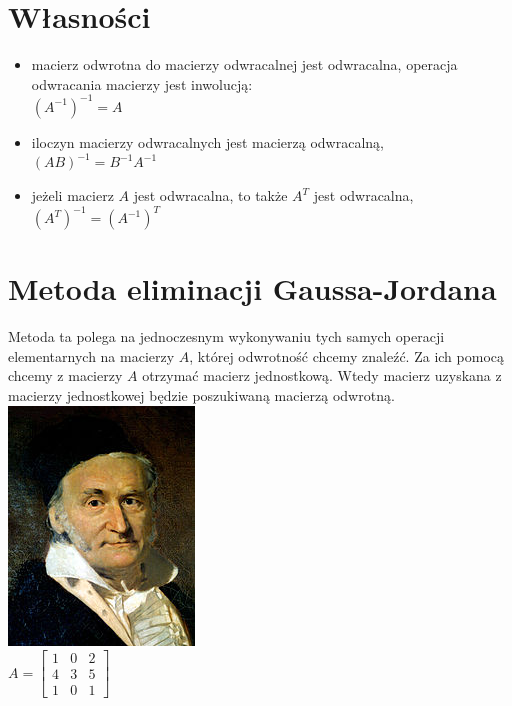 \documentclass[12pt, a4paper]{article}
\begin{document}
\newpage
\section{Własności}
\indent
\begin{itemize}
\item   macierz odwrotna do macierzy odwracalnej jest odwracalna, operacja odwracania macierzy jest inwolucją:
\\  $(A^{-1})^{-1} = A$
\item   iloczyn macierzy odwracalnych jest macierzą odwracalną,
\\  $(AB)^{-1} = B^{-1}A^{-1}$
\item   jeżeli macierz $A$ jest odwracalna, to także $A^{T}$ jest odwracalna,
\\  $(A^{T})^{-1} = (A^{-1})^{T}$
\end{itemize}


\newpage
\section{Metoda eliminacji Gaussa-Jordana}

Metoda ta polega na jednoczesnym wykonywaniu tych samych operacji elementarnych na macierzy $A$, której odwrotność chcemy znaleźć. Za ich pomocą chcemy z macierzy $A$ otrzymać macierz jednostkową. Wtedy macierz uzyskana z macierzy jednostkowej będzie poszukiwaną macierzą odwrotną.
\\
\includegraphics{Carl_Friedrich_Gauss.jpg}
\\

\begin{math}
    A= \left[
    \begin{array}{ccc}
        1 & 0 & 2\\
        4 & 3 & 5\\
        1 & 0 & 1
    \end{array}
    \right]
    \qquad
\end{math}


\newpage
{}
\end{document}
